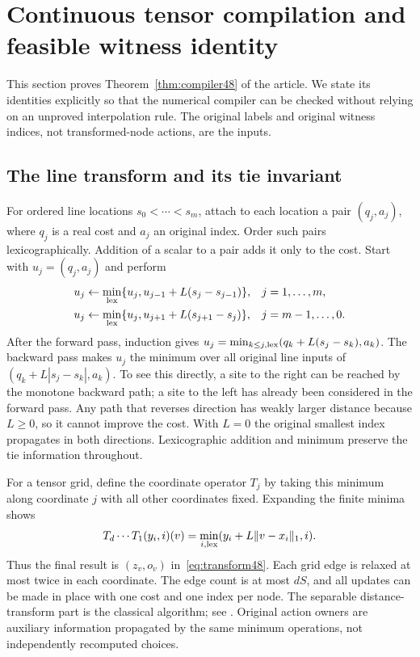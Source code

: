 \section{Continuous tensor compilation and feasible witness identity}\label{supp:compiler48}
This section proves Theorem~\ref{thm:compiler48} of the article. We state its identities explicitly so that the numerical compiler can be checked without relying on an unproved interpolation rule. The original labels and original witness indices, not transformed-node actions, are the inputs.

\subsection{The line transform and its tie invariant}
For ordered line locations $s_0<\cdots<s_m$, attach to each location a pair $(q_j,a_j)$, where $q_j$ is a real cost and $a_j$ an original index. Order such pairs lexicographically. Addition of a scalar to a pair adds it only to the cost. Start with $u_j=(q_j,a_j)$ and perform
\begin{align}\label{eq:line48}
 u_j&\leftarrow\min_{\rm lex}\{u_j,u_{j-1}+L(s_j-s_{j-1})\},
       &&j=1,\ldots,m,\\
 u_j&\leftarrow\min_{\rm lex}\{u_j,u_{j+1}+L(s_{j+1}-s_j)\},
       &&j=m-1,\ldots,0.\notag
\end{align}
After the forward pass, induction gives $u_j=\min_{k\le j,\rm lex}(q_k+L(s_j-s_k),a_k)$. The backward pass makes $u_j$ the minimum over all original line inputs of $(q_k+L|s_j-s_k|,a_k)$. To see this directly, a site to the right can be reached by the monotone backward path; a site to the left has already been considered in the forward pass. Any path that reverses direction has weakly larger distance because $L\ge0$, so it cannot improve the cost. With $L=0$ the original smallest index propagates in both directions. Lexicographic addition and minimum preserve the tie information throughout.

For a tensor grid, define the coordinate operator $T_j$ by taking this minimum along coordinate $j$ with all other coordinates fixed. Expanding the finite minima shows
\[
 T_d\cdots T_1(y_i,i)(v)
 =\min_{i,\rm lex}(y_i+L\|v-x_i\|_1,i).
\]
Thus the final result is $(z_v,o_v)$ in~\eqref{eq:transform48}. Each grid edge is relaxed at most twice in each coordinate. The edge count is at most $dS$, and all updates can be made in place with one cost and one index per node. The separable distance-transform part is the classical algorithm; see \citet{felzenszwalb2012}. Original action owners are auxiliary information propagated by the same minimum operations, not independently recomputed choices.

